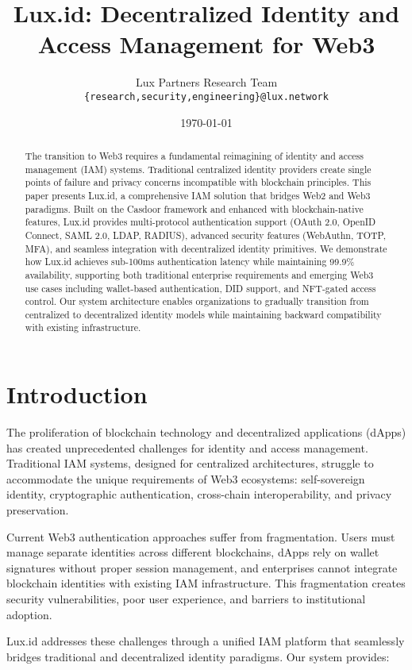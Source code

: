 \documentclass[11pt,a4paper]{article}
\title{Lux.id: Decentralized Identity and Access Management for Web3}
\author{Lux Partners Research Team\\
\texttt{\{research,security,engineering\}@lux.network}}
\date{\today}
\begin{document}
\maketitle

\begin{abstract}
The transition to Web3 requires a fundamental reimagining of identity and access management (IAM) systems. Traditional centralized identity providers create single points of failure and privacy concerns incompatible with blockchain principles. This paper presents Lux.id, a comprehensive IAM solution that bridges Web2 and Web3 paradigms. Built on the Casdoor framework and enhanced with blockchain-native features, Lux.id provides multi-protocol authentication support (OAuth 2.0, OpenID Connect, SAML 2.0, LDAP, RADIUS), advanced security features (WebAuthn, TOTP, MFA), and seamless integration with decentralized identity primitives. We demonstrate how Lux.id achieves sub-100ms authentication latency while maintaining 99.9\% availability, supporting both traditional enterprise requirements and emerging Web3 use cases including wallet-based authentication, DID support, and NFT-gated access control. Our system architecture enables organizations to gradually transition from centralized to decentralized identity models while maintaining backward compatibility with existing infrastructure.
\end{abstract}

\section{Introduction}

The proliferation of blockchain technology and decentralized applications (dApps) has created unprecedented challenges for identity and access management. Traditional IAM systems, designed for centralized architectures, struggle to accommodate the unique requirements of Web3 ecosystems: self-sovereign identity, cryptographic authentication, cross-chain interoperability, and privacy preservation.

Current Web3 authentication approaches suffer from fragmentation. Users must manage separate identities across different blockchains, dApps rely on wallet signatures without proper session management, and enterprises cannot integrate blockchain identities with existing IAM infrastructure. This fragmentation creates security vulnerabilities, poor user experience, and barriers to institutional adoption.

Lux.id addresses these challenges through a unified IAM platform that seamlessly bridges traditional and decentralized identity paradigms. Our system provides:
\end{document}
